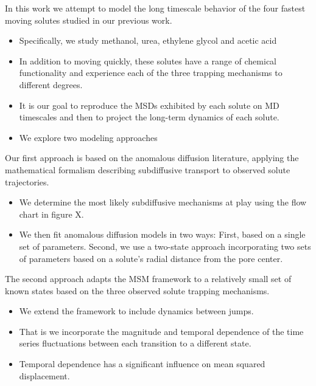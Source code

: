 \documentclass{article}
\begin{document}
  In this work we attempt to model the long timescale behavior of the four 
  fastest moving solutes studied in our previous work.
  \begin{itemize}
    \item Specifically, we study methanol, urea, ethylene glycol and acetic acid
    \item In addition to moving quickly, these solutes have a range of chemical
    functionality and experience each of the three trapping mechanisms to different
    degrees.
    \item It is our goal to reproduce the MSDs exhibited by each solute on MD timescales
    and then to project the long-term dynamics of each solute. 
    \item We explore two modeling approaches
  \end{itemize}
  
  Our first approach is based on the anomalous diffusion literature, applying the 
  mathematical formalism describing subdiffusive transport to observed solute 
  trajectories.
  \begin{itemize}
    \item We determine the most likely subdiffusive mechanisms at play using the 
    flow chart in figure X. 
    \item We then fit anomalous diffusion models in two ways: First, based on a
    single set of parameters. Second, we use a two-state approach incorporating
    two sets of parameters based on a solute's radial distance from the pore center. 
  \end{itemize}
  
  The second approach adapts the MSM framework to a relatively small set of known 
  states based on the three observed solute trapping mechanisms.
  \begin{itemize}
    \item We extend the framework to include dynamics between jumps. 
    \item That is we incorporate the magnitude and temporal dependence of the 
    time series fluctuations between each transition to a different state. 
    \item Temporal dependence has a significant influence on mean squared displacement.
  \end{itemize}
\end{document}
